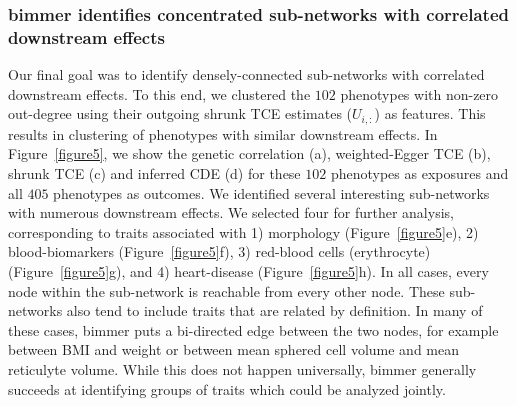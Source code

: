 \documentclass{article}
\begin{document}
\subsubsection*{bimmer identifies concentrated sub-networks with correlated downstream effects}
Our final goal was to identify densely-connected sub-networks with correlated downstream effects.
To this end, we clustered the $102$ phenotypes with non-zero out-degree using their
outgoing shrunk TCE estimates ($U_{i, :}$) as features.
This results in clustering of phenotypes with similar downstream effects.
In Figure~\ref{figure5}, we show the genetic correlation (a), weighted-Egger TCE (b), shrunk TCE (c) and
inferred CDE (d) for these $102$ phenotypes as exposures and all $405$ phenotypes as outcomes.
We identified several interesting sub-networks with numerous downstream effects. We selected four
for further analysis, corresponding to traits associated with 1) morphology (Figure~\ref{figure5}e),
2) blood-biomarkers (Figure~\ref{figure5}f), 3) red-blood cells (erythrocyte) (Figure~\ref{figure5}g),
and 4)  heart-disease (Figure~\ref{figure5}h).
In all cases, every node within the sub-network is reachable from every other node. 
These sub-networks also tend to include traits that are related by definition. In many of these cases,
bimmer puts a bi-directed edge between the two nodes, for example between BMI and weight or
between mean sphered cell volume and mean reticulyte volume. While this does not happen universally,
bimmer generally succeeds at identifying groups of traits which could be analyzed jointly. 
\end{document}
